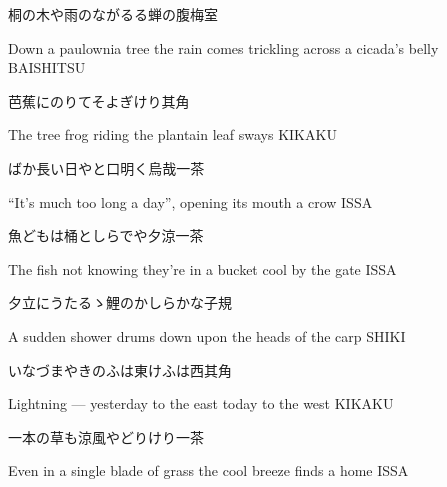 \begin{haiku}
    {\FH 桐の木や雨のながるる蝉の腹}\hfill{\FH 梅室}

    \vin{} Down a paulownia tree
    \vin{} \vin{} the rain comes trickling
    \vin{} \vin{} \vin{} across a cicada's belly \hspace{\fill} BAISHITSU
\end{haiku}

\begin{haiku}
    {\FH {}芭蕉にのりてそよぎけり}\hfill{\FH 其角}

    \vin{} The tree frog
    \vin{} \vin{} riding the plantain leaf
    \vin{} \vin{} \vin{} sways \hspace{\fill} KIKAKU
\end{haiku}

\begin{haiku}
    {\FH ばか長い日やと口明く烏哉}\hfill{\FH 一茶}

    \vin{} ``It's much too long a day'',
    \vin{} \vin{} opening its mouth
    \vin{} \vin{} \vin{} a crow \hspace{\fill} ISSA
\end{haiku}

\begin{haiku}
    {\FH 魚どもは桶としらでや夕涼}\hfill{\FH 一茶}

    \vin{} The fish
    \vin{} \vin{} not knowing they're in a bucket
    \vin{} \vin{} \vin{} cool by the gate \hspace{\fill} ISSA
\end{haiku}

\begin{haiku}
    {\FH 夕立にうたるゝ鯉のかしらかな}\hfill{\FH 子規}

    \vin{} A sudden shower
    \vin{} \vin{} drums down upon
    \vin{} \vin{} \vin{} the heads of the carp \hspace{\fill} SHIKI
\end{haiku}

\begin{haiku}
    {\FH いなづまやきのふは東けふは西}\hfill{\FH 其角}

    \vin{} Lightning ---
    \vin{} \vin{} yesterday to the east
    \vin{} \vin{} \vin{} today to the west \hspace{\fill} KIKAKU
\end{haiku}

\begin{haiku}
    {\FH 一本の草も涼風やどりけり}\hfill{\FH 一茶}

    \vin{} Even in a single blade of grass
    \vin{} \vin{} the cool breeze
    \vin{} \vin{} \vin{} finds a home \hspace{\fill} ISSA
\end{haiku}

